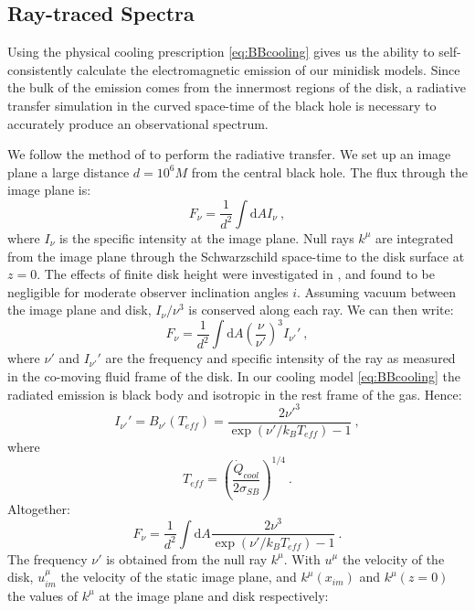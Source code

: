 \documentclass{emulateapj}
\newcommand{\sig}{\sigma}
\newcommand{\dd}{\mbox{d}}
\begin{document}
\subsection{Ray-traced Spectra}
\label{subsec:raySpec}

Using the physical cooling prescription \eqref{eq:BBcooling} gives us the ability to self-consistently calculate the electromagnetic emission of our minidisk models.  Since the bulk of the emission comes from the innermost regions of the disk, a radiative transfer simulation in the curved space-time of the black hole is necessary to accurately produce an observational spectrum.

We follow the method of \cite{Kulkarni11, Zhu12} to perform the radiative transfer.  We set up an image plane a large distance $d = 10^6 M$ from the central black hole.  The flux through the image plane is:
\begin{equation}
	F_\nu = \frac{1}{d^2} \int \dd A I_\nu \ ,
\end{equation}
where $I_\nu$ is the specific intensity at the image plane.  Null rays $k^\mu$ are integrated from the image plane through the Schwarzschild space-time to the disk surface at $z=0$.  The effects of finite disk height were investigated in \cite{Kulkarni11}, and found to be negligible %
for moderate observer inclination angles $i$. Assuming vacuum between the image plane and disk, $I_\nu / \nu^3$ is conserved along each ray.  We can then write:
\begin{equation}
	F_\nu = \frac{1}{d^2} \int \dd A \left( \frac{\nu}{\nu'} \right)^3 I_{\nu'}' \ ,
\end{equation}
where $\nu'$ and $I_{\nu'}'$ are the frequency and specific intensity of the ray as measured in the co-moving fluid frame of the disk. In our cooling model \eqref{eq:BBcooling} the radiated emission is black body and isotropic in the rest frame of the gas.  Hence:
\begin{equation}
	I_{\nu'}' = B_{\nu '} (T_{eff}) = \frac{2 {\nu'}^3}{\exp\left(\nu' / k_B T_{eff}\right) - 1}\ ,
\end{equation}
where
\begin{equation}
	T_{eff} = \left(\frac{\dot{Q}_{cool}}{2 \sig_{SB}} \right)^{1/4} \ .
\end{equation}
Altogether:
\begin{equation}
	F_{\nu} = \frac{1}{d^2} \int \dd A \frac{2 \nu^3}{\exp\left(\nu' / k_B T_{eff}\right) - 1} \ .
\end{equation}
The frequency $\nu'$ is obtained from the null ray $k^\mu$.  With $u^\mu$ the velocity of the disk, $u_{im}^\mu$ the velocity of the static image plane, and $k^\mu(x_{im})$ and $k^\mu(z=0)$ the values of $k^\mu$ at the image plane and disk respectively:
\end{document}
